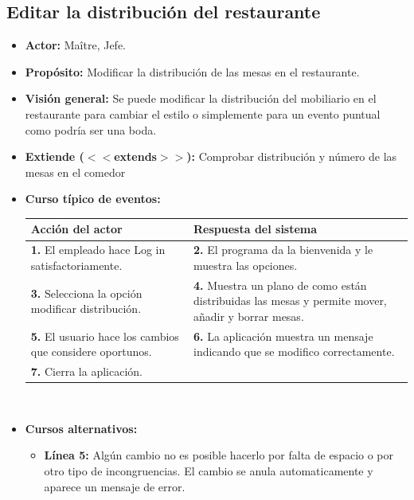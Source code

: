 \documentclass[spanish,a4paper,12pt]{report}	%
\begin{document}
		\subsection{Editar la distribución del restaurante}
			\begin{itemize}
			\item \textbf{Actor:} Maître, Jefe.
			\item \textbf{Propósito: } Modificar la distribución de las mesas en el restaurante.
			\item \textbf{Visión general:} Se puede modificar la distribución del mobiliario en el restaurante para cambiar el estilo o simplemente para un evento puntual como podría ser una boda.
			\item \textbf{Extiende ($<<$extends$>>$):} Comprobar distribución y número de las mesas en el comedor
			\item \textbf{Curso típico de eventos:} 	\\
				\begin{tabular}{|p{6cm}||p{6cm}|}
				\hline
				\textbf{Acción del actor} & \textbf{Respuesta del sistema} \\ \hline \hline
				\textbf{1.} El empleado hace Log in satisfactoriamente. & \textbf{2.} El programa da la bienvenida y le muestra las opciones. \\ \hline
				\textbf{3.} Selecciona la opción modificar distribución. & \textbf{4.} Muestra un plano de como están distribuidas las mesas y permite mover, añadir y borrar mesas. \\ \hline
				\textbf{5.} El usuario hace los cambios que considere oportunos.	& \textbf{6.} La aplicación muestra un mensaje indicando que se modifico correctamente. \\ \hline
				\textbf{7.} Cierra la aplicación. & \textbf{} \\ \hline
			\end{tabular}
			\\
			\item \textbf{Cursos alternativos:} 
			\begin{itemize}
			\item  \textbf{Línea 5:} Algún cambio no es posible hacerlo por falta de espacio o por otro tipo de incongruencias. El cambio se anula automaticamente y aparece un mensaje de error.
			\end {itemize}
		\end {itemize}

\end{document}
